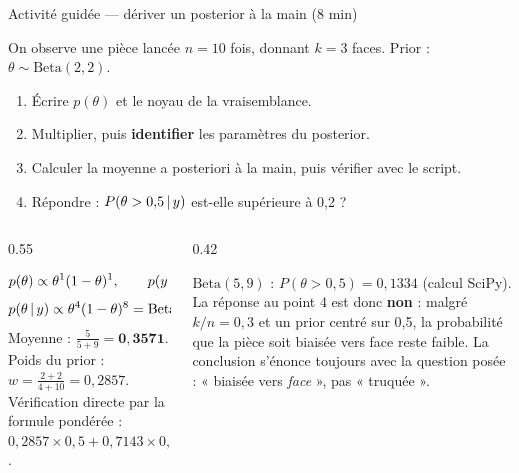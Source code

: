 \begin{frame}{Activité guidée — dériver un posterior à la main (8 min)}
\small
\begin{abox}
On observe une pièce lancée $n = 10$ fois, donnant $k = 3$ faces.
Prior : $\theta \sim \mathrm{Beta}(2,2)$.
\begin{enumerate}
  \item Écrire $p(\theta)$ et le noyau de la vraisemblance.
  \item Multiplier, puis \textbf{identifier} les paramètres du posterior.
  \item Calculer la moyenne a posteriori à la main, puis vérifier avec le script.
  \item Répondre : $P(\theta > 0{,}5 \,\vert\, y)$ est-elle supérieure à 0,2 ?
\end{enumerate}
\end{abox}
\vspace{1mm}
\begin{columns}[t]
\begin{column}{0.55\textwidth}
\begin{solbox}
\[
p(\theta) \propto \theta^{1}(1-\theta)^{1}, \qquad
p(y \,\vert\, \theta) \propto \theta^{3}(1-\theta)^{7}
\]
\[
p(\theta \,\vert\, y) \propto \theta^{4}(1-\theta)^{8}
= \mathrm{Beta}(5, 9)
\]
Moyenne : $\frac{5}{5+9} = \mathbf{0{,}3571}$.
Poids du prior : $w = \frac{2+2}{4+10} = 0{,}2857$.
Vérification directe par la formule pondérée :
$0{,}2857 \times 0{,}5 + 0{,}7143 \times 0{,}3 = 0{,}3571$.
\end{solbox}
\end{column}
\begin{column}{0.42\textwidth}
\begin{ebox}
$\mathrm{Beta}(5,9)$ : $P(\theta > 0{,}5) = 0{,}1334$ (calcul SciPy).
La réponse au point 4 est donc \textbf{non} : malgré $k/n = 0{,}3$ et un prior
centré sur 0,5, la probabilité que la pièce soit biaisée vers face reste faible.
La conclusion s'énonce toujours avec la question posée : « biaisée vers
\emph{face} », pas « truquée ».
\end{ebox}
\end{column}
\end{columns}
\end{frame}

